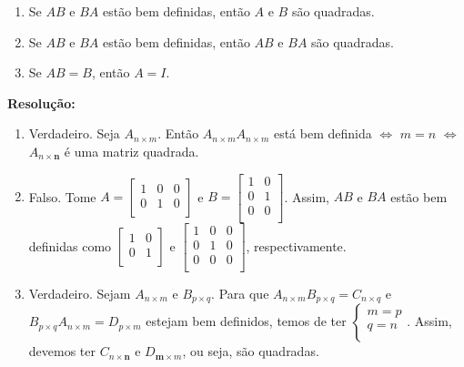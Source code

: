\documentclass[leqno]{article}
\begin{document}
\begin{enumerate}
\begin{enumerate}
        \item Se $AB$ e $BA$ estão bem definidas, então $A$ e $B$ são quadradas.
        
        \item Se $AB$ e $BA$ estão bem definidas, então $AB$ e $BA$ são quadradas.
        
        \item Se $AB=B$, então $A=I$.
    \end{enumerate}
    
    \textbf{Resolução:}
    
    \begin{enumerate}
        \item Verdadeiro. Seja $A_{n\times m}$. Então $A_{n\times m}A_{n\times m}$ está bem definida $\iff$ $m=n$ $\iff$ $A_{n\times \textbf{n}}$ é uma matriz quadrada.
        
        \item Falso. Tome $A=\begin{bmatrix}
        1 & 0 & 0\\
        0 & 1 & 0\\
        \end{bmatrix}$ e $B=\begin{bmatrix}
        1 & 0\\
        0 & 1\\
        0 & 0\\
        \end{bmatrix}$. Assim, $AB$ e $BA$ estão bem definidas como $\begin{bmatrix}
        1 & 0\\
        0 & 1\\
        \end{bmatrix}$ e $\begin{bmatrix}
        1 & 0 & 0\\
        0 & 1 & 0\\
        0 & 0 & 0\\
        \end{bmatrix}$, respectivamente.
        
        \item Verdadeiro. Sejam $A_{n\times m}$ e $B_{p\times q}$. Para que $A_{n\times m}B_{p\times q}=C_{n\times q}$ e $B_{p\times q}A_{n\times m}=D_{p\times m}$ estejam bem definidos, temos de ter $\begin{cases}
        m=p\\
        q=n\\
        \end{cases}$. Assim, devemos ter $C_{n\times \textbf{n}}$ e $D_{\textbf{m}\times m}$, ou seja, são quadradas.
        

\end{enumerate}
\end{enumerate}
\end{document}
